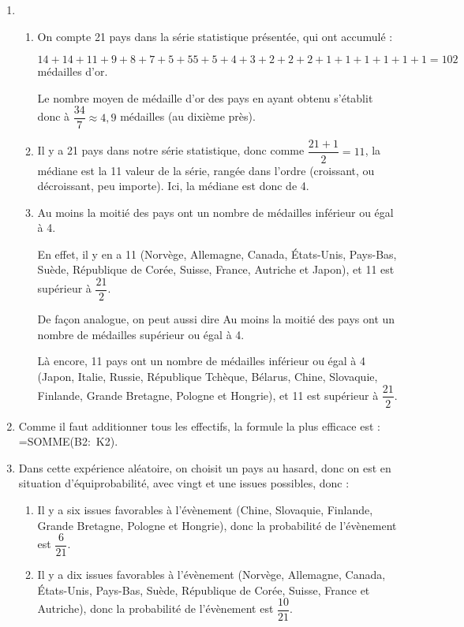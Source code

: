 
\medskip

\begin{enumerate}
	\item 
		\begin{enumerate}
			\item On compte 21 pays dans la série statistique présentée, qui ont accumulé :
		
		$14 + 14 + 11 + 9 + 8 + 7 + 5 + 5 5 + 5 + 4 + 3 + 2 + 2 + 2+ 1+1+1+1+1+1 = 102$ médailles d'or.
		
		Le nombre moyen de médaille d'or des pays en ayant obtenu s'établit donc à $\dfrac{34}{7}\approx 4,9$ médailles (au dixième près).
		
			\item Il y a 21 pays dans notre série statistique, donc comme $\dfrac{21 + 1}{2} = 11$, la médiane est la 11 valeur de la série, rangée dans l'ordre (croissant, ou décroissant, peu importe). Ici, la médiane est donc de 4. 
		
			\item Au moins la moitié des pays ont un nombre de médailles inférieur ou égal à 4. 
		
En effet, il y en a 11 (Norvège, Allemagne, Canada, États-Unis, Pays-Bas, Suède, République de Corée, Suisse, France, Autriche et Japon), et 11 est supérieur à $\dfrac{21}{2}$.
		
\medskip

De façon analogue, on peut aussi dire \og Au moins la moitié des pays ont un nombre de médailles supérieur ou égal à 4.\fg
		
Là encore, 11 pays ont un nombre de médailles inférieur ou égal à 4 (Japon, Italie, Russie, République Tchèque, Bélarus, Chine, Slovaquie, Finlande, Grande Bretagne, Pologne et Hongrie), et 11 est supérieur à $\dfrac{21}{2}$.
		\end{enumerate}
	\item Comme il faut additionner tous les effectifs, la formule la plus efficace est : \textsf{=SOMME(B2:~K2)}.
	\item Dans cette expérience aléatoire, on choisit un pays au hasard, donc on est en situation d'équiprobabilité, avec vingt et une issues possibles, donc :
		\begin{enumerate}
			\item Il y a six issues favorables à l'évènement (Chine, Slovaquie, Finlande, Grande Bretagne, Pologne et Hongrie), donc la probabilité de l'évènement est $\dfrac{6}{21}$.
			\item Il y a dix issues favorables à l'évènement (Norvège, Allemagne, Canada, États-Unis, Pays-Bas, Suède, République de Corée, Suisse, France et Autriche), donc la probabilité de l'évènement est $\dfrac{10}{21}$.
		\end{enumerate}
\end{enumerate}

\vspace{0,5cm}

